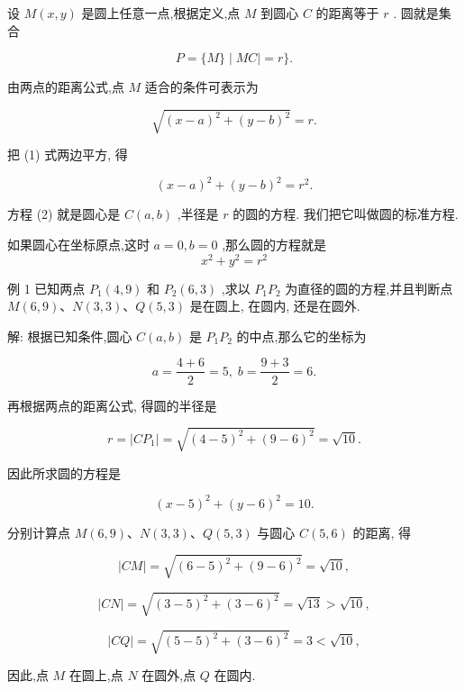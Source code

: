\documentclass[lang=cn,newtx,10pt,scheme=chinese]{elegantbook}
\begin{document}
设 \(M\left( {x,y}\right)\) 是圆上任意一点,根据定义,点 \(M\) 到圆心 \(C\) 的距离等于 \(r\) . 圆就是集合

\[
  P = \{ M\} \mid {MC} \mid = r\} .
\]

由两点的距离公式,点 \(M\) 适合的条件可表示为

\[
  \sqrt{{\left( x - a\right) }^{2} + {\left( y - b\right) }^{2}} = r. \tag{1}
\]

把 (1) 式两边平方, 得

\[
    {\left( x - a\right) }^{2} + {\left( y - b\right) }^{2} = {r}^{2}. \tag{2}
\]

方程 (2) 就是圆心是 \(C\left( {a,b}\right)\) ,半径是 \(r\) 的圆的方程. 我们把它叫做圆的标准方程.
\begin{definition}[圆的标准方程]
	如果圆心在坐标原点,这时 \(a = 0,b = 0\) ,那么圆的方程就是
	\[
	{x}^{2} + {y}^{2} = {r}^{2}
	\]
\end{definition}


例 1 已知两点 \({P}_{1}\left( {4,9}\right)\) 和 \({P}_{2}\left( {6,3}\right)\) ,求以 \({P}_{1}{P}_{2}\) 为直径的圆的方程,并且判断点 \(M\left( {6,9}\right) \text{、}N\left( {3,3}\right) \text{、}Q\left( {5,3}\right)\) 是在圆上, 在圆内, 还是在圆外.

解: 根据已知条件,圆心 \(C\left( {a,b}\right)\) 是 \({P}_{1}{P}_{2}\) 的中点,那么它的坐标为

\[
  a = \frac{4 + 6}{2} = 5,\;b = \frac{9 + 3}{2} = 6.
\]

再根据两点的距离公式, 得圆的半径是

\[
  r = \left| {C{P}_{1}}\right| = \sqrt{{\left( 4 - 5\right) }^{2} + {\left( 9 - 6\right) }^{2}} = \sqrt{10}.
\]

因此所求圆的方程是

\[
    {\left( x - 5\right) }^{2} + {\left( y - 6\right) }^{2} = {10}.
\]

分别计算点 \(M\left( {6,9}\right) \text{、}N\left( {3,3}\right) \text{、}Q\left( {5,3}\right)\) 与圆心 \(C\left( {5,6}\right)\) 的距离, 得

\[
  \left| {CM}\right| = \sqrt{{\left( 6 - 5\right) }^{2} + {\left( 9 - 6\right) }^{2}} = \sqrt{10},
\]

\[
  \left| {CN}\right| = \sqrt{{\left( 3 - 5\right) }^{2} + {\left( 3 - 6\right) }^{2}} = \sqrt{13} > \sqrt{10},
\]

\[
  \left| {CQ}\right| = \sqrt{{\left( 5 - 5\right) }^{2} + {\left( 3 - 6\right) }^{2}} = 3 < \sqrt{10},
\]

因此,点 \(M\) 在圆上,点 \(N\) 在圆外,点 \(Q\) 在圆内.
\end{document}
